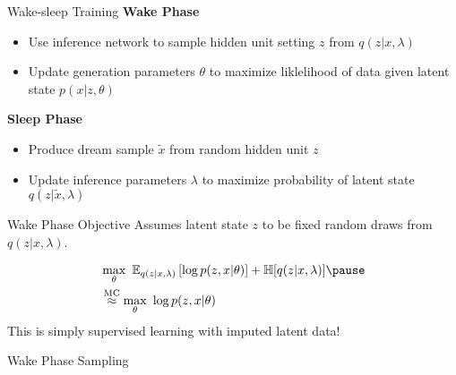 \documentclass[14pt]{beamer}
\begin{document}
\begin{frame}{Wake-sleep Training}
\textbf{Wake Phase} \\
\begin{itemize}
\item Use inference network to sample hidden unit setting $ z $ from $ q(z|x,\lambda) $
\item Update generation parameters $ \theta $ to maximize liklelihood of data given latent state $ p(x|z,\theta) $
\end{itemize}
\pause
\textbf{Sleep Phase}
\begin{itemize}
\item Produce dream sample $ \tilde{x} $ from random hidden unit $ z $
\item Update inference parameters $ \lambda $ to maximize probability of latent state $ q(z|\tilde{x},\lambda) $
\end{itemize}
\end{frame}

\begin{frame}{Wake Phase Objective}
Assumes latent state $ z $ to be fixed random draws from $ q(z|x,\lambda) $.

\begin{equation*}
\begin{aligned}
&\max_{\theta}~ \mathbb E_{q(z|x, \lambda)}\left[ \log p(z, x| \theta) \right] + \mathbb H[q(z|x, \lambda)]  \pause \\
&\overset{\text{MC}}{\approx} \max_{\theta}~  \log p(z, x| \theta) 
\end{aligned}
\end{equation*} \pause
This is simply supervised learning with imputed latent data!
\end{frame}

\begin{frame}{Wake Phase Sampling}
\begin{figure}
\center
{}
\end{figure}
\end{frame}
\end{document}
